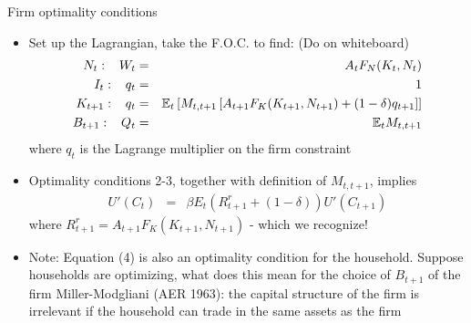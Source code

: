 \documentclass[9pt,xcolor={dvipsnames}]{beamer}
\newcommand{\bit}{\begin{itemize}}
\newcommand{\eit}{\end{itemize}}
\newcommand{\bc}{\color{blue}}
\newcommand{\rc}{\color{red}}
\begin{document}
\begin{frame}{Firm optimality conditions}

\bit
\setlength\itemsep{1.5em} 
\item Set up the Lagrangian, take the F.O.C. to find: {\rc (Do on whiteboard)}
\begin{eqnarray}
\setcounter{equation}{1}
N_t: \hspace{3mm} W_t &=& A_t F_N(K_t, N_t)  \\
I_{t}: \hspace{3mm} q_t &=& 1  \\
K_{t+1}: \hspace{3mm} q_t &=&  \mathbb E_t \left[M_{t,t+1}\left[A_{t+1}F_K(K_{t+1}, N_{t+1}) + (1-\delta)q_{t+1} \right] \right]  \\
B_{t+1}: \hspace{3mm} Q_t &=& \mathbb E_t M_{t,t+1} 
\end{eqnarray}
where $q_t$ is the Lagrange multiplier on the firm constraint

\item Optimality conditions 2-3, together with definition of $M_{t,t+1}$, implies
\begin{eqnarray}
U'(C_t) &=& \beta E_t(R^{r}_{t+1}+(1-\delta)) U'(C_{t+1}) \nonumber 
\end{eqnarray}
where $R^{r}_{t+1}= A_{t+1}F_K(K_{t+1}, N_{t+1})$ - which we recognize!

\item Note: Equation (4) is also an optimality condition for the household. Suppose households are optimizing, what does this mean for the choice of $B_{t+1}$ of the firm {\bc Miller-Modgliani (AER 1963): the capital structure of the firm is irrelevant if the household can trade in the same assets as the firm}

\eit

\end{frame}
\end{document}
